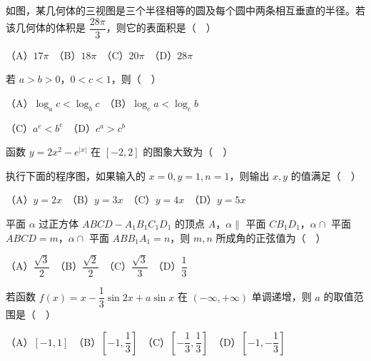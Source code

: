 \begin{question}
如图，某几何体的三视图是三个半径相等的圆及每个圆中两条相互垂直的半径。若该几何体的体积是 \(\dfrac{28\pi}{3}\)，则它的表面积是（　）
\nopagebreak[4]
\begin{center}\end{center}
\nopagebreak[4]
   （A）\(17\pi\)　（B）\(18\pi\)　（C）\(20\pi\)　（D）\(28\pi\)

\end{question}
\begin{question}
若 \(a>b>0\)，\(0<c<1\)，则（　）

   （A）\(\log_a c<\log_b c\)　（B）\(\log_c a<\log_c b\)

   （C）\(a^c<b^c\)　（D）\(c^a>c^b\)

\Needspace{0.4\textheight}
\end{question}
\begin{question}
函数 \(y=2x^2-e^{|x|}\) 在 \([-2,2]\) 的图象大致为（　）
\nopagebreak[4]
\begin{center}\end{center}
\nopagebreak[4]
\Needspace{0.4\textheight}
\end{question}
\begin{question}
执行下面的程序图，如果输入的 \(x=0,y=1,n=1\)，则输出 \(x,y\) 的值满足（　）
\nopagebreak[4]
\begin{center}\end{center}
\nopagebreak[4]
   （A）\(y=2x\)　（B）\(y=3x\)　（C）\(y=4x\)　（D）\(y=5x\)

\end{question}
\begin{question}
平面 \(\alpha\) 过正方体 \(ABCD-A_1B_1C_1D_1\) 的顶点 \(A\)，\(\alpha\parallel\) 平面 \(CB_1D_1\)，\(\alpha\cap\) 平面 \(ABCD=m\)，\(\alpha\cap\) 平面 \(ABB_1A_1=n\)，则 \(m,n\) 所成角的正弦值为（　）

   （A）\(\dfrac{\sqrt{3}}{2}\)　（B）\(\dfrac{\sqrt{2}}{2}\)　（C）\(\dfrac{\sqrt{3}}{3}\)　（D）\(\dfrac{1}{3}\)

\end{question}
\begin{question}
若函数 \(f(x)=x-\dfrac{1}{3}\sin 2x+a\sin x\) 在 \(( -\infty,+\infty )\) 单调递增，则 \(a\) 的取值范围是（　）

   （A）\([-1,1]\)　（B）\([-1,\dfrac{1}{3}]\)　（C）\([-\dfrac{1}{3},\dfrac{1}{3}]\)　（D）\([-1,-\dfrac{1}{3}]\)

\end{question}

